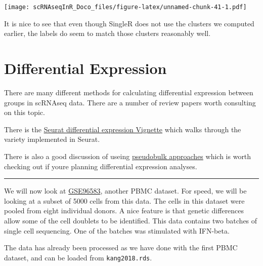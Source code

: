 \documentclass[
]{book}
\begin{document}
\texttt{[image: scRNAseqInR\_Doco\_files/figure-latex/unnamed-chunk-41-1.pdf]}

It is nice to see that even though SingleR does not use the clusters we computed earlier, the labels do seem to match those clusters reasonably well.

\hypertarget{de2}{%
\chapter{Differential Expression}\label{de2}}

There are many different methods for calculating differential expression between groups in scRNAseq data. There are a number of review papers worth consulting on this topic.

There is the \href{https://satijalab.org/seurat/archive/v3.1/de_vignette.html}{Seurat differential expression Vignette} which walks through the variety implemented in Seurat.

There is also a good discussion of useing \href{http://bioconductor.org/books/3.15/OSCA.multisample/multi-sample-comparisons.html\#creating-pseudo-bulk-samples}{pseudobulk approaches} which is worth checking out if youre planning differential expression analyses.

\begin{center}\rule{0.5\linewidth}{0.5pt}\end{center}

We will now look at \href{https://www.ncbi.nlm.nih.gov/geo/query/acc.cgi?acc=GSE96583}{GSE96583}, another PBMC dataset. For speed, we will be looking at a subset of 5000 cells from this data. The cells in this dataset were pooled from eight individual donors. A nice feature is that genetic differences allow some of the cell doublets to be identified. This data contains two batches of single cell sequencing. One of the batches was stimulated with IFN-beta.

The data has already been processed as we have done with the first PBMC dataset, and can be loaded from \texttt{kang2018.rds}.
\end{document}
